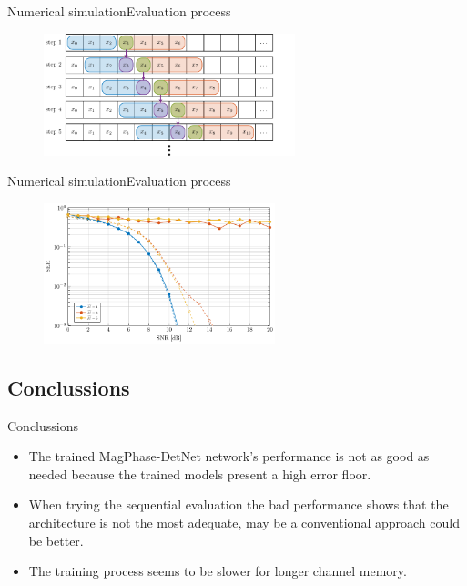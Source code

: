 \documentclass[en]{sdqbeamer}
\begin{document}
\begin{frame}{Numerical simulation}{Evaluation process}

\begin{figure}[!ht]
\begin{center}
\includegraphics[width=0.65\textwidth]{eval_seq.pdf}
\end{center}
\end{figure}

\end{frame}


\begin{frame}{Numerical simulation}{Evaluation process}

\begin{figure}[!ht]
\begin{center}
\includegraphics[width=0.6\textwidth]{SER_seq_test.pdf}
\end{center}
\end{figure}
\end{frame}



\subsection{Conclussions}

\begin{frame}{Conclussions}

\begin{itemize}
\item The trained MagPhase-DetNet network's performance is not as good as needed because the trained models present a high error floor.
\item When trying the sequential evaluation the bad performance shows that the architecture is not the most adequate, may be a conventional approach could be better.
\item The training process seems to be slower for longer channel memory.
\end{itemize}








\end{frame}
\end{document}
